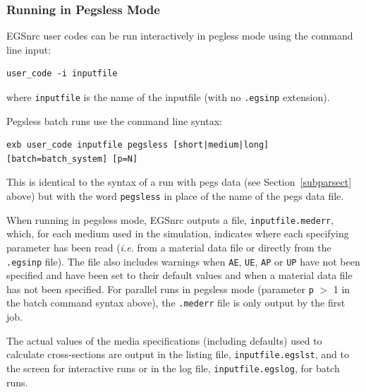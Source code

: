 \documentclass[12pt,twoside]{article}  %
\begin{document}
\subsubsection{Running in Pegsless Mode}

EGSnrc user codes can be run interactively in pegless mode using the command line input:
\begin{verbatim}
user_code -i inputfile
\end{verbatim}
where {\tt inputfile} is the name of the inputfile (with no
{\tt .egsinp} extension).

Pegsless batch runs use the command line syntax:
\begin{verbatim}
exb user_code inputfile pegsless [short|medium|long] [batch=batch_system] [p=N]
\end{verbatim}
This is identical to the syntax of a run with pegs data (see Section~\ref{subparsect} above) but
with the word {\tt pegsless} in place of the name of the pegs data file.

When running in pegsless mode, EGSnrc outputs a file, {\tt inputfile.mederr}, which, for each medium used
in the simulation, indicates where each specifying parameter has been read ({\it i.e.} from a material data
file or directly from the {\tt .egsinp} file).  The file also includes warnings when {\tt AE}, {\tt UE},
{\tt AP} or {\tt UP} have not been specified and have been set to their default values and when a material
data file has not been specified.  For parallel runs in pegsless mode (parameter {\tt p} $>$ 1 in the batch
command syntax above), the {\tt .mederr} file is only output by the first job.

The actual values of the media specifications (including defaults) used to calculate cross-sections are
output in the listing file, {\tt inputfile.egslst}, and to the screen for interactive runs or in the
log file, {\tt inputfile.egslog}, for batch runs.
\end{document}
